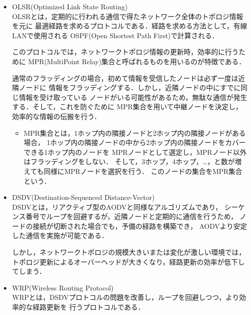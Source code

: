 \documentclass[a4paper, 11pt]{ltjsarticle}
\begin{document}
\begin{itemize}
  \item OLSR(Optimized Link State Routing)\cite{OLSR}\\
  OLSRとは，定期的に行われる通信で得たネットワーク全体のトポロジ情報を元に
  最適経路を求めるプロトコルである．経路を求める方法として，有線LANで使用される
  OSPF(Open Shortest Path First)で計算される．

  このプロトコルでは，ネットワークトポロジ情報の更新時，効率的に行うために
  MPR(MultiPoint Relay)集合と呼ばれるものを用いるのが特徴である．
  
  通常のフラッディングの場合，初めて情報を受信したノードは必ず一度は近隣ノードに
  情報をフラッディングする．しかし，近隣ノードの中にすでに同じ情報を受け取っている
  ノードがいる可能性があるため，無駄な通信が発生する．そして，これを防ぐために
  MPR集合を用いて中継ノードを決定し，効率的な情報の伝搬を行う．
  
  \begin{itemize}
    \item MPR集合とは，1ホップ内の隣接ノードと2ホップ内の隣接ノードがある場合，
    1ホップ内の隣接ノードの中から2ホップ内の隣接ノードをカバーできる1ホップ内のノードを
    MPRノードとして選定し，MPRノード以外はフラッディングをしない．
    そして，3ホップ，4ホップ，\dots，と数が増えても同様にMPRノードを選択を行う．
    このノードの集合をMPR集合という．\\
  \end{itemize}

  \item DSDV(Destination-Sequenced Distance-Vector)\cite{DSDV}\\
  DSDVとは，リアクティブ型のAODVと同様なアルゴリズムであり，
  シーケンス番号でループを回避するが，近隣ノードと定期的に通信を行うため，
  ノードの接続が切断された場合でも，予備の経路を構築でき，
  AODVより安定した通信を実施が可能である．

  しかし，ネットワークトポロジの規模大きいまたは変化が激しい環境では，
  トポロジ更新によるオーバーヘッドが大きくなり，経路更新の効率が低下してしまう．\\

  \item WRP(Wireless Routing Protocol)\cite{WRP}\\
  WRPとは，DSDVプロトコルの問題を改善し，ループを回避しつつ，より効率的な経路更新を
  行うプロトコルである．


\end{itemize}
\end{document}
